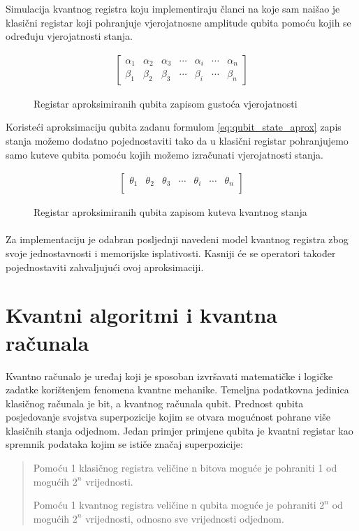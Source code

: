\documentclass[times, utf8, zavrsni, numeric]{fer}
\begin{document}
Simulacija kvantnog registra koju implementiraju članci na koje sam naišao je klasični registar koji pohranjuje vjerojatnosne amplitude qubita pomoću kojih se određuju vjerojatnosti stanja. \citep{han_qga_combinat}\citep{han_analysis}\citep{han_phd}
\begin{figure}[htb]
\centering
\begin{align*}
\begin{bmatrix}
\alpha_1 & \alpha_2 & \alpha_3 & \cdots & \alpha_i & \cdots & \alpha_n \\
\beta_1 & \beta_2 & \beta_3 & \cdots & \beta_i & \cdots & \beta_n
\end{bmatrix}
\end{align*}
\caption{Registar aproksimiranih qubita zapisom gustoća vjerojatnosti}
\end{figure}

Koristeći aproksimaciju qubita zadanu formulom \ref{eq:qubit_state_aprox} zapis stanja možemo dodatno pojednostaviti tako da u klasični registar pohranjujemo samo kuteve qubita pomoću kojih možemo izračunati vjerojatnosti stanja.
\begin{figure}[htb]
\centering
\begin{align*}
\begin{bmatrix}
\theta_1 & \theta_2 & \theta_3 & \cdots & \theta_i & \cdots & \theta_n \\
\end{bmatrix}
\end{align*}
\caption{Registar aproksimiranih qubita zapisom kuteva kvantnog stanja}
\end{figure}

\paragraph{}
Za implementaciju je odabran posljednji navedeni model kvantnog registra zbog svoje jednostavnosti i memorijske isplativosti. Kasniji će se operatori također pojednostaviti zahvaljujući ovoj aproksimaciji.

\clearpage

\section{Kvantni algoritmi i kvantna računala}
Kvantno računalo je uređaj koji je sposoban izvršavati matematičke i logičke zadatke korištenjem fenomena kvantne mehanike. Temeljna podatkovna jedinica klasičnog računala je bit, a kvantnog računala qubit. Prednost qubita posjedovanje svojstva superpozicije kojim se otvara mogućnost pohrane više klasičnih stanja odjednom. Jedan primjer primjene qubita je kvantni registar kao spremnik podataka kojim se ističe značaj superpozicije:
\begin{quote}
Pomoću 1 klasičnog registra veličine n bitova moguće je pohraniti 1 od mogućih $2^n$ vrijednosti.

Pomoću 1 kvantnog registra veličine n qubita moguće je pohraniti $2^n$ od mogućih $2^n$ vrijednosti, odnosno sve vrijednosti odjednom. \citep{qga}
\end{quote}
\end{document}
